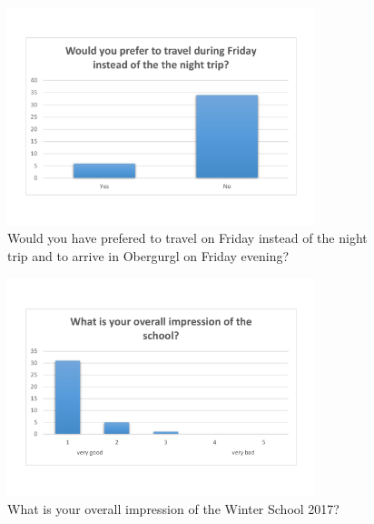 \documentclass[11pt,a4paper]{article}
\numberwithin{equation}{section}
\numberwithin{table}{section}\setlength{\multlinegap}{25pt}
\begin{document}
\begin{figure}[H]
\centering
\includegraphics[width=0.8\textwidth]{eval/general/travel_per_night.pdf}
\vspace{-1.0cm}
\caption{Would you have prefered to travel on Friday instead of the night trip and to arrive in Obergurgl on Friday evening?}
\end{figure}
\begin{figure}[H]
\centering
\includegraphics[width=0.8\textwidth]{eval/general/overall_impression.pdf}
\vspace{-1.0cm}
\caption{What is your overall impression of the Winter School 2017?}
\end{figure}
\end{document}
